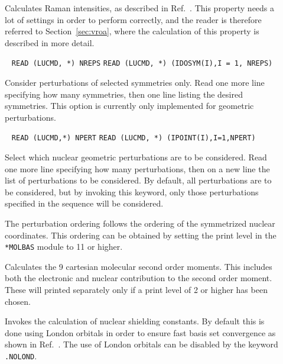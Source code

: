 \begin{description}
\item[] Calculates Raman intensities, as described in
Ref.~\cite{thkrklbpjjofd99}. This property needs a lot of settings
in order to perform correctly, and the reader is therefore referred to
Section~\ref{sec:vroa}, where the calculation of this property is described in more detail.

\item[] \verb| |\newline
\verb|READ (LUCMD, *) NREPS|\newline
\verb|READ (LUCMD, *) (IDOSYM(I),I = 1, NREPS)|

Consider perturbations of selected symmetries only.  Read one more
line specifying how many symmetries, then one line listing the
desired symmetries. This option is currently only implemented
for geometric perturbations.


\item[]\verb| |
\newline
\verb|READ (LUCMD,*) NPERT|\newline
\verb|READ (LUCMD, *) (IPOINT(I),I=1,NPERT)|

Select which nuclear geometric perturbations are to be considered.
Read one more line specifying how many perturbations, then on a
new line the list of perturbations to be considered. By default,
all perturbations are to be considered, but by invoking this keyword,
only those perturbations specified in the sequence will be considered.

The perturbation ordering follows the ordering of the symmetrized
nuclear coordinates. This ordering can be obtained by setting the
print level in the \verb|*MOLBAS| module to 11 or higher.

\item[] Calculates the 9 cartesian molecular second order
moments.
This includes both the electronic and nuclear contribution to the
second order moment. These will printed separately only if a print
level of 2 or higher has been chosen.

\item[] Invokes the calculation of nuclear
shielding constants. By default this is done
using London orbitals in order to
ensure fast basis set convergence as shown in
Ref.~\cite{kwjfhppjacs112,krthrkpjklbhjajjcp100}. The use of London
orbitals can be disabled by the keyword \verb|.NOLOND|.


\end{description}
